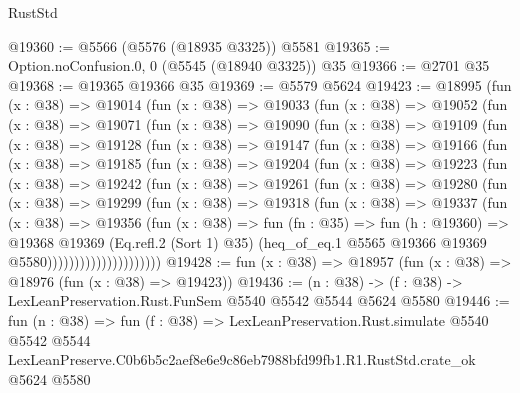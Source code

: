 \begin{lexlean}{RustStd}
\begin{coremodule}
@19360 := @5566 (@5576 (@18935 @3325)) @5581
@19365 := Option.noConfusion.{0, 0} (@5545 (@18940 @3325)) @35
@19366 := @2701 @35
@19368 := @19365 @19366 @35
@19369 := @5579 @5624
@19423 := @18995
    (fun (x : @38) =>
    @19014
      (fun (x : @38) =>
      @19033
        (fun (x : @38) =>
        @19052
          (fun (x : @38) =>
          @19071
            (fun (x : @38) =>
            @19090
              (fun (x : @38) =>
              @19109
                (fun (x : @38) =>
                @19128
                  (fun (x : @38) =>
                  @19147
                    (fun (x : @38) =>
                    @19166
                      (fun (x : @38) =>
                      @19185
                        (fun (x : @38) =>
                        @19204
                          (fun (x : @38) =>
                          @19223
                            (fun (x : @38) =>
                            @19242
                              (fun (x : @38) =>
                              @19261
                                (fun (x : @38) =>
                                @19280
                                  (fun (x : @38) =>
                                  @19299
                                    (fun (x : @38) =>
                                    @19318
                                      (fun (x : @38) =>
                                      @19337
                                        (fun (x : @38) =>
                                        @19356
                                          (fun (x : @38) =>
                                          fun (fn : @35) =>
                                          fun (h : @19360) =>
                                          @19368
                                            @19369
                                            (Eq.refl.{2} (Sort 1) @35)
                                            (heq_of_eq.{1}
                                              @5565
                                              @19366
                                              @19369
                                              @5580)))))))))))))))))))))
@19428 := fun (x : @38) => @18957 (fun (x : @38) => @18976 (fun (x : @38) => @19423))
@19436 := (n : @38) -> (f : @38) -> LexLeanPreservation.Rust.FunSem @5540 @5542 @5544 @5624 @5580
@19446 := fun (n : @38) =>
  fun (f : @38) =>
  LexLeanPreservation.Rust.simulate
    @5540
    @5542
    @5544
    LexLeanPreserve.C0b6b5c2aef8e6e9c86eb7988bfd99fb1.R1.RustStd.crate_ok
    @5624
    @5580
\end{coremodule}
\end{lexlean}
